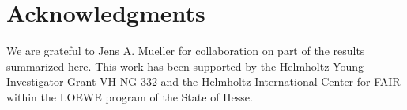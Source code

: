 \documentclass[a4paper,fleqn]{cas-dc}
\begin{document}
\section*{Acknowledgments}
We are grateful to Jens A. Mueller for collaboration on part of the results summarized here. This work has been supported
by the Helmholtz Young Investigator Grant VH-NG-332 and the Helmholtz International Center for FAIR within the LOEWE
program of the State of Hesse.





\end{document}
